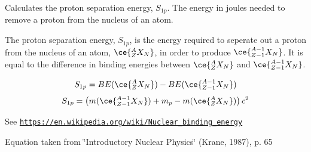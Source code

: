 Calculates the proton separation energy, $S_{1p}$. The energy in joules needed to remove a proton from the nucleus of an atom. 

The proton separation energy, $S_{1p}$, is the energy required to seperate out a proton from the nucleus of an atom, $\ce{ ^{A}_{Z}X_{N} }$, in order to produce $\ce{ ^{A-1}_{Z-1}X_{N} }$. It is equal to the difference in binding energies between $\ce{ ^{A}_{Z}X_{N} }$ and $\ce{ ^{A-1}_{Z-1}X_{N} }$.

\[S_{1p} = BE(\ce{ ^{A}_{Z}X_{N} }) - BE(\ce{ ^{A-1}_{Z-1}X_{N} })\] \[S_{1p} = \left ( m(\ce{ ^{A-1}_{Z-1}X_{N} }) + m_p - m(\ce{ ^{A}_{Z}X_{N} }) \right ) c^2\]

See \href{https://en.wikipedia.org/wiki/Nuclear_binding_energy}{\tt https\+://en.\+wikipedia.\+org/wiki/\+Nuclear\+\_\+binding\+\_\+energy}

Equation taken from \char`\"{}\+Introductory Nuclear Physics\char`\"{} (Krane, 1987), p. 65



